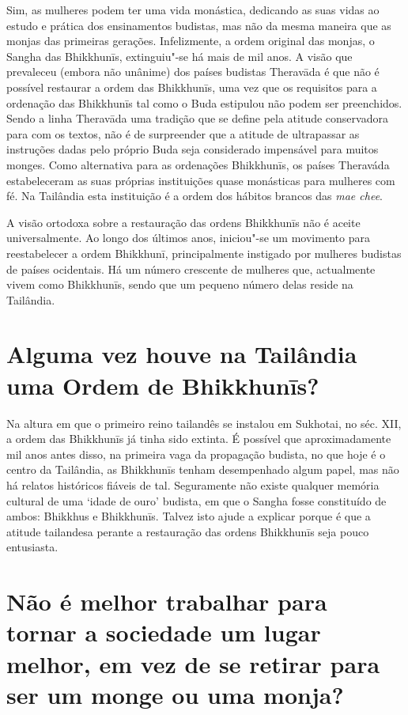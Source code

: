Sim, as mulheres podem ter uma vida monástica, dedicando as suas vidas
ao estudo e prática dos ensinamentos budistas, mas não da mesma maneira
que as monjas das primeiras gerações. Infelizmente, a ordem original das
monjas, o Sangha das Bhikkhunīs, extinguiu"-se há mais de mil anos. A
visão que prevaleceu (embora não unânime) dos países budistas Theravāda
é que não é possível restaurar a ordem das Bhikkhunīs, uma vez que os
requisitos para a ordenação das Bhikkhunīs tal como o Buda estipulou não
podem ser preenchidos. Sendo a linha Theravāda uma tradição que se
define pela atitude conservadora para com os textos, não é de
surpreender que a atitude de ultrapassar as instruções dadas pelo
próprio Buda seja considerado impensável para muitos monges. Como
alternativa para as ordenações Bhikkhunīs, os países Theraváda
estabeleceram as suas próprias instituições quase monásticas para
mulheres com fé. Na Tailândia esta instituição é a ordem dos hábitos
brancos das \emph{mae chee}.

A visão ortodoxa sobre a restauração das ordens Bhikkhunīs não é aceite
universalmente. Ao longo dos últimos anos, iniciou"-se um movimento para
reestabelecer a ordem Bhikkhunī, principalmente instigado por mulheres
budistas de países ocidentais. Há um número crescente de mulheres que,
actualmente vivem como Bhikkhunīs, sendo que um pequeno número delas
reside na Tailândia.

\section{Alguma vez houve na Tailândia uma Ordem de Bhikkhunīs?}

Na altura em que o primeiro reino tailandês se instalou em Sukhotai, no
séc. XII, a ordem das Bhikkhunīs já tinha sido extinta. É possível que
aproximadamente mil anos antes disso, na primeira vaga da propagação
budista, no que hoje é o centro da Tailândia, as Bhikkhunīs tenham
desempenhado algum papel, mas não há relatos históricos fiáveis de tal.
Seguramente não existe qualquer memória cultural de uma `idade de
ouro' budista, em que o Sangha fosse constituído de ambos: Bhikkhus e
Bhikkhunīs. Talvez isto ajude a explicar porque é que a atitude
tailandesa perante a restauração das ordens Bhikkhunīs seja pouco
entusiasta.

\section{Não é melhor trabalhar para tornar a sociedade um lugar melhor, em vez
  de se retirar para ser um monge ou uma monja?}

